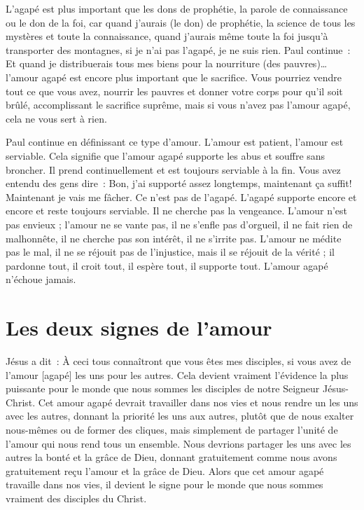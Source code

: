L'agapé est plus important que les dons de prophétie,
 la parole de connaissance ou le don de la foi,
 car \og quand j'aurais (le don) de prophétie,
 la science de tous les mystères et toute la connaissance,
 quand j'aurais même toute la foi jusqu'à transporter des montagnes,
 si je n'ai pas l'agapé, je ne suis rien. \fg{} Paul continue~:
 \og Et quand je distribuerais tous mes biens
 pour la nourriture (des pauvres)\dots{} \fg{}
 l'amour agapé est encore plus important que le sacrifice.
 Vous pourriez vendre tout ce que vous avez, nourrir les pauvres
 et donner votre corps pour qu'il soit brûlé, accomplissant le sacrifice
 suprême, mais si vous n'avez pas l'amour agapé,
 cela ne vous sert à rien.

Paul continue en définissant ce type d'amour.
 \og L'amour est patient, l'amour est serviable. \fg{}
 Cela signifie que l'amour agapé supporte les abus et souffre sans broncher.
 Il prend continuellement et est toujours serviable à la fin.
 Vous avez entendu des gens dire~:
 \og Bon, j'ai supporté assez longtemps, maintenant ça suffit!
 Maintenant je vais me fâcher. \fg{}
 Ce n'est pas de l'agapé. L'agapé supporte encore et encore
 et reste toujours serviable. Il ne cherche pas la vengeance.
 \og L'amour n'est pas envieux ; l'amour ne se vante pas,
 il ne s'enfle pas d'orgueil, il ne fait rien de malhonnête,
 il ne cherche pas son intérêt, il ne s'irrite pas.
 L'amour ne médite pas le mal, il ne se réjouit pas de l'injustice,
 mais il se réjouit de la vérité ; il pardonne tout, il croit tout,
 il espère tout, il supporte tout. \fg{}
 L'amour agapé \og n'échoue jamais. \fg{}


\section*{Les deux signes de l'amour}

Jésus a dit~:
 \og À ceci tous connaîtront que vous êtes mes disciples,
 si vous avez de l'amour [agapé] les uns pour les autres. \fg{}
 Cela devient vraiment l'évidence la plus puissante pour le monde
 que nous sommes les disciples de notre Seigneur Jésus-Christ.
 Cet amour agapé devrait travailler dans nos vies et nous rendre un
 les uns avec les autres, donnant la priorité les uns aux autres,
 plutôt que de nous exalter nous-mêmes ou de former des cliques,
 mais simplement de partager l'unité de l'amour qui nous rend
 tous un ensemble.
 Nous devrions partager les uns avec les autres la bonté et la grâce de Dieu,
 donnant gratuitement comme nous avons gratuitement reçu l'amour
 et la grâce de Dieu.
 Alors que cet amour agapé travaille dans nos vies,
 il devient le signe pour le monde que nous sommes vraiment
 des disciples du Christ.

